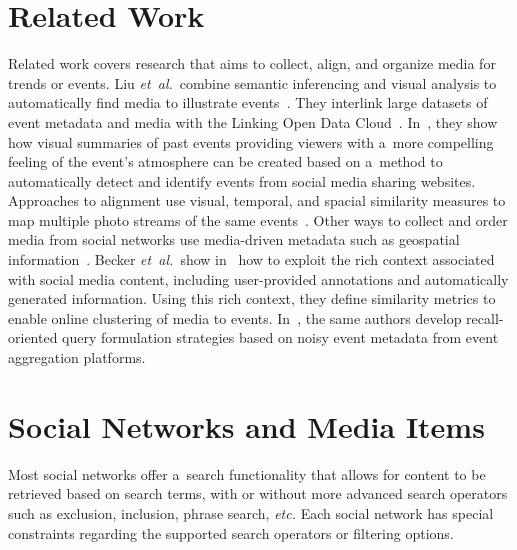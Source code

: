 \section{Related Work}

Related work covers research
that aims to collect, align, and organize media
for trends or events.
Liu \emph{et~al.}\ combine semantic inferencing and visual analysis
to automatically find media to illustrate
events~\cite{liu2011events}.
They interlink large datasets of event metadata
and media with the Linking Open Data
Cloud~\cite{bizer2011statelodcloud,cyganiak2011lodcloud}.
In~\cite{liu2011socialmedia}, they show how visual summaries
of past events providing viewers with a~more compelling feeling
of the event's atmosphere can be created
based on a~method to automatically detect and identify events
from social media sharing websites.
Approaches to alignment use visual, temporal,
and spacial similarity measures to map multiple photo streams of
the same events~\cite{yang2011photostream}.
Other ways to collect and order media from social networks use
media-driven metadata such as geospatial
information~\cite{crandall2009mappingphotos}.
Becker \emph{et~al.}\ show in~\cite{becker2010eventidentification}
how to exploit the rich context associated with social media
content, including user-provided annotations
and automatically generated information.
Using this rich context, they define similarity metrics
to enable online clustering of media to events.
In~\cite{becker2012plannedevents}, the same authors develop
recall-oriented query formulation strategies
based on noisy event metadata
from event aggregation platforms.

\section{Social Networks and Media Items}                                    \label{sec:social-networks}

Most social networks offer a~search functionality that allows for
content to be retrieved based on search terms,
with or without more advanced search operators
such as exclusion, inclusion, phrase search, \emph{etc.}
Each social network has special constraints
regarding the supported search operators or filtering options.

